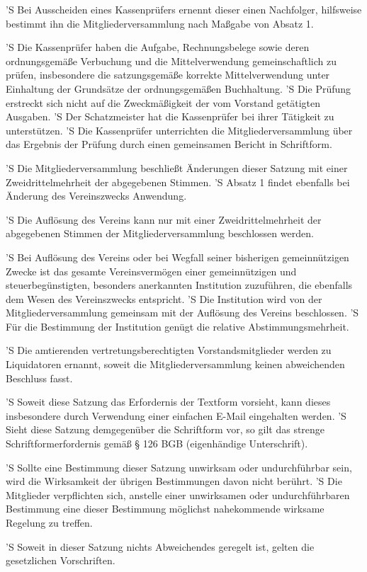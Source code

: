 \documentclass[a4paper,10pt]{scrreprt}
\begin{document}
\begin{contract}
'S Bei Ausscheiden eines Kassenprüfers ernennt dieser einen Nachfolger,
hilfsweise bestimmt ihn die Mitgliederversammlung nach Maßgabe von Absatz 1.

'S Die Kassenprüfer haben die Aufgabe, Rechnungsbelege sowie deren
ordnungsgemäße Verbuchung und die Mittelverwendung gemeinschaftlich zu prüfen,
insbesondere die satzungsgemäße korrekte Mittelverwendung unter Einhaltung der
Grundsätze der ordnungsgemäßen Buchhaltung.
'S Die Prüfung erstreckt sich nicht auf die Zweckmäßigkeit der vom Vorstand
getätigten Ausgaben.
'S Der Schatzmeister hat die Kassenprüfer bei ihrer Tätigkeit zu unterstützen.
'S Die Kassenprüfer unterrichten die Mitgliederversammlung über das Ergebnis
der Prüfung durch einen gemeinsamen Bericht in Schriftform.


'S Die Mitgliederversammlung beschließt Änderungen dieser Satzung mit einer
Zweidrittelmehrheit der abgegebenen Stimmen.
'S Absatz 1 findet ebenfalls bei Änderung des Vereinszwecks Anwendung.


'S Die Auflösung des Vereins kann nur mit einer Zweidrittelmehrheit der
abgegebenen Stimmen der Mitgliederversammlung beschlossen werden.

'S Bei Auflösung des Vereins oder bei Wegfall seiner bisherigen gemeinnützigen
Zwecke ist das gesamte Vereinsvermögen einer gemeinnützigen und
steuerbegünstigten, besonders anerkannten Institution zuzuführen, die ebenfalls
dem Wesen des Vereinszwecks entspricht.
'S Die Institution wird von der Mitgliederversammlung gemeinsam mit der
Auflösung des Vereins beschlossen.
'S Für die Bestimmung der Institution genügt die relative Abstimmungsmehrheit.

'S Die amtierenden vertretungsberechtigten Vorstandsmitglieder werden zu
Liquidatoren ernannt, soweit die Mitgliederversammlung keinen abweichenden
Beschluss fasst.


'S Soweit diese Satzung das Erfordernis der Textform vorsieht, kann dieses
insbesondere durch Verwendung einer einfachen E-Mail eingehalten werden.
'S Sieht diese Satzung demgegenüber die Schriftform vor, so gilt das strenge
Schriftformerfordernis gemäß § 126 BGB (eigenhändige Unterschrift).

'S Sollte eine Bestimmung dieser Satzung unwirksam oder undurchführbar sein,
wird die Wirksamkeit der übrigen Bestimmungen davon nicht berührt.
'S Die Mitglieder verpflichten sich, anstelle einer unwirksamen oder
undurchführbaren Bestimmung eine dieser Bestimmung möglichst nahekommende
wirksame Regelung zu treffen.

'S Soweit in dieser Satzung nichts Abweichendes geregelt ist, gelten die
gesetzlichen Vorschriften.
\end{contract}
\end{document}

